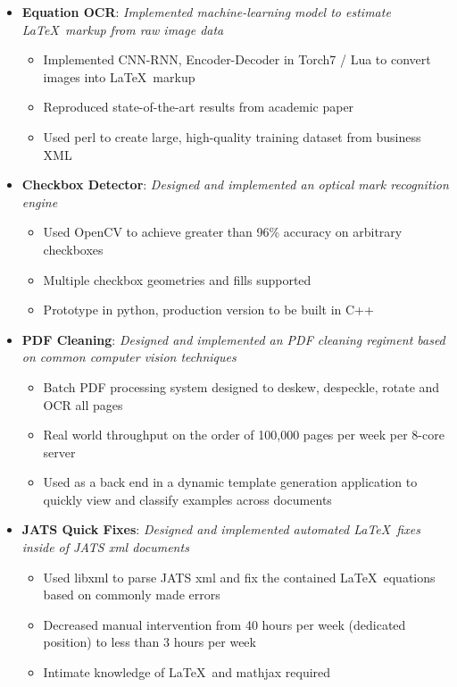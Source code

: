 \documentclass[a3paper]{article}
\newcommand{\ListItem}[2]{
	\item \small \textbf{#1}{: \it #2}
}
\begin{document}
\begin{itemize}[label=\faUsers]
\begin{itemize}[label=\faGears]
		\ListItem{Equation OCR}{Implemented machine-learning model to estimate \LaTeX\ markup from raw image data}
		\begin{itemize}[label=\faGear]
			\item Implemented CNN-RNN, Encoder-Decoder in Torch7 / Lua to convert images into \LaTeX\ markup
			\item Reproduced state-of-the-art results from academic paper
			\item Used perl to create large, high-quality training dataset from business XML
		\end{itemize}
	
		\ListItem{Checkbox Detector}{Designed and implemented an optical mark recognition engine}
		\begin{itemize}[label=\faGear]
			\item Used OpenCV to achieve greater than 96\% accuracy on arbitrary checkboxes
			\item Multiple checkbox geometries and fills supported
			\item Prototype in python, production version to be built in C++
		\end{itemize}

		\ListItem{PDF Cleaning}{Designed and implemented an PDF cleaning regiment based on common computer vision techniques}
		\begin{itemize}[label=\faGear]
			\item Batch PDF processing system designed to deskew, despeckle, rotate and OCR all pages
			\item Real world throughput on the order of 100,000 pages per week per 8-core server
			\item Used as a back end in a dynamic template generation application to quickly view and classify examples across documents
		\end{itemize}

		\ListItem{JATS Quick Fixes}{Designed and implemented automated \LaTeX\ fixes inside of JATS xml documents}
		\begin{itemize}[label=\faGear]
			\item Used libxml to parse JATS xml and fix the contained \LaTeX\ equations based on commonly made errors
			\item Decreased manual intervention from 40 hours per week (dedicated position) to less than 3 hours per week
			\item Intimate knowledge of \LaTeX\ and mathjax required
		\end{itemize}


\end{itemize}
\end{itemize}
\end{document}
